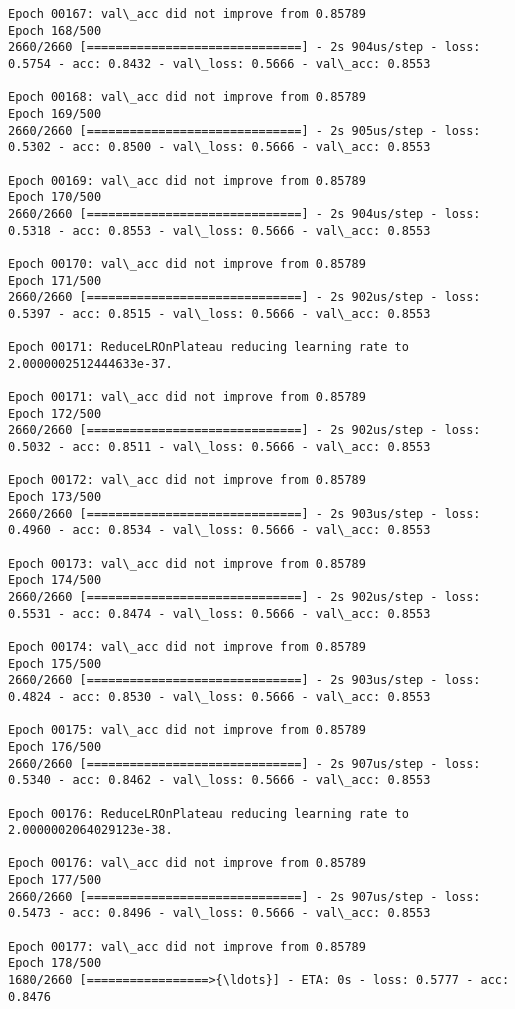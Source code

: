 \documentclass[11pt]{article}
\begin{document}
\begin{Verbatim}[commandchars=\\\{\}]
Epoch 00167: val\_acc did not improve from 0.85789
Epoch 168/500
2660/2660 [==============================] - 2s 904us/step - loss: 0.5754 - acc: 0.8432 - val\_loss: 0.5666 - val\_acc: 0.8553

Epoch 00168: val\_acc did not improve from 0.85789
Epoch 169/500
2660/2660 [==============================] - 2s 905us/step - loss: 0.5302 - acc: 0.8500 - val\_loss: 0.5666 - val\_acc: 0.8553

Epoch 00169: val\_acc did not improve from 0.85789
Epoch 170/500
2660/2660 [==============================] - 2s 904us/step - loss: 0.5318 - acc: 0.8553 - val\_loss: 0.5666 - val\_acc: 0.8553

Epoch 00170: val\_acc did not improve from 0.85789
Epoch 171/500
2660/2660 [==============================] - 2s 902us/step - loss: 0.5397 - acc: 0.8515 - val\_loss: 0.5666 - val\_acc: 0.8553

Epoch 00171: ReduceLROnPlateau reducing learning rate to 2.0000002512444633e-37.

Epoch 00171: val\_acc did not improve from 0.85789
Epoch 172/500
2660/2660 [==============================] - 2s 902us/step - loss: 0.5032 - acc: 0.8511 - val\_loss: 0.5666 - val\_acc: 0.8553

Epoch 00172: val\_acc did not improve from 0.85789
Epoch 173/500
2660/2660 [==============================] - 2s 903us/step - loss: 0.4960 - acc: 0.8534 - val\_loss: 0.5666 - val\_acc: 0.8553

Epoch 00173: val\_acc did not improve from 0.85789
Epoch 174/500
2660/2660 [==============================] - 2s 902us/step - loss: 0.5531 - acc: 0.8474 - val\_loss: 0.5666 - val\_acc: 0.8553

Epoch 00174: val\_acc did not improve from 0.85789
Epoch 175/500
2660/2660 [==============================] - 2s 903us/step - loss: 0.4824 - acc: 0.8530 - val\_loss: 0.5666 - val\_acc: 0.8553

Epoch 00175: val\_acc did not improve from 0.85789
Epoch 176/500
2660/2660 [==============================] - 2s 907us/step - loss: 0.5340 - acc: 0.8462 - val\_loss: 0.5666 - val\_acc: 0.8553

Epoch 00176: ReduceLROnPlateau reducing learning rate to 2.0000002064029123e-38.

Epoch 00176: val\_acc did not improve from 0.85789
Epoch 177/500
2660/2660 [==============================] - 2s 907us/step - loss: 0.5473 - acc: 0.8496 - val\_loss: 0.5666 - val\_acc: 0.8553

Epoch 00177: val\_acc did not improve from 0.85789
Epoch 178/500
1680/2660 [=================>{\ldots}] - ETA: 0s - loss: 0.5777 - acc: 0.8476
    \end{Verbatim}
\end{document}
